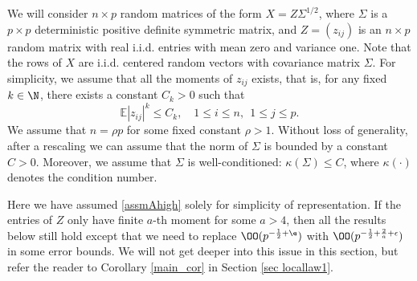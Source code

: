 \begin{assumption}%
We will consider $n\times p$ random matrices of the form $X=Z\Sigma^{1/2}$, where $\Sigma$  is a $p\times p$ deterministic positive definite symmetric matrix, and $Z=(z_{ij})$ is an $n\times p$ random matrix with real i.i.d. entries with mean zero and variance one. Note that the rows of $X$ are i.i.d. centered random vectors with covariance matrix $\Sigma$. For simplicity, we assume that all the moments of $z_{ij}$ exists, that is, for any fixed $k\in \N$, there exists a constant $C_k>0$ such that
\begin{equation}\label{assmAhigh}
\mathbb{E} |z_{ij}|^k \le C_k ,\quad 1\le i \le n, \ \ 1\le j \le p.
\end{equation}
 We assume that $n=\rho p$ for some fixed constant $\rho>1$. Without loss of generality, after a rescaling we can assume that the norm of $\Sigma$ is bounded by a constant $C>0$. Moreover, we assume that $\Sigma$ is well-conditioned: $\kappa(\Sigma)\le C$, where $\kappa(\cdot)$ denotes the condition number.
\end{assumption}
Here we have assumed \eqref{assmAhigh} solely for simplicity of representation. If the entries of $Z$ only have finite $a$-th moment for some $a>4$, then all the results below still hold except that we need to replace $\OO(p^{-\frac12+\e})$ with $\OO( p^{-\frac12+\frac2a +\epsilon})$ in some error bounds.
We will not get deeper into this issue in this section, but refer the reader to Corollary \ref{main_cor} in Section \ref{sec locallaw1}.
\fi


